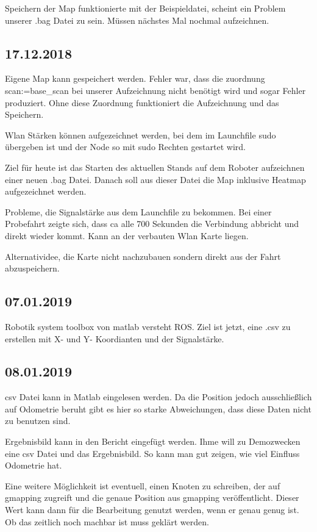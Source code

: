 \documentclass{scrartcl}%
\begin{document}
Speichern der Map funktionierte mit der Beispieldatei, scheint ein Problem unserer .bag Datei zu sein. Müssen nächstes Mal nochmal aufzeichnen.

\subsection{17.12.2018}
Eigene Map kann gespeichert werden. Fehler war, dass die zuordnung scan:=base\_scan bei unserer Aufzeichnung nicht benötigt wird und sogar Fehler produziert. Ohne diese Zuordnung funktioniert die Aufzeichnung und das Speichern.

Wlan Stärken können aufgezeichnet werden, bei dem im Launchfile sudo übergeben ist und der Node so mit sudo Rechten gestartet wird.

Ziel für heute ist das Starten des aktuellen Stands auf dem Roboter aufzeichnen einer neuen .bag Datei. Danach soll aus dieser Datei die Map inklusive Heatmap aufgezeichnet werden.

Probleme, die Signalstärke aus dem Launchfile zu bekommen. Bei einer Probefahrt zeigte sich, dass ca alle 700 Sekunden die Verbindung abbricht und direkt wieder kommt. Kann an der verbauten Wlan Karte liegen.

Alternatividee, die Karte nicht nachzubauen sondern direkt aus der Fahrt abzuspeichern.

\subsection{07.01.2019}
Robotik system toolbox von matlab versteht ROS. Ziel ist jetzt, eine .csv zu erstellen mit X- und Y- Koordianten und der Signalstärke.

\subsection{08.01.2019}
csv Datei kann in Matlab eingelesen werden. Da die Position jedoch ausschließlich auf Odometrie beruht gibt es hier so starke Abweichungen, dass diese Daten nicht zu benutzen sind.

Ergebnisbild kann in den Bericht eingefügt werden. Ihme will zu Demozwecken eine csv Datei und das Ergebnisbild. So kann man gut zeigen, wie viel Einfluss Odometrie hat.

Eine weitere Möglichkeit ist eventuell, einen Knoten zu schreiben, der auf gmapping zugreift und die genaue Position aus gmapping veröffentlicht. Dieser Wert kann dann für die Bearbeitung genutzt werden, wenn er genau genug ist. Ob das zeitlich noch machbar ist muss geklärt werden.
\end{document}
